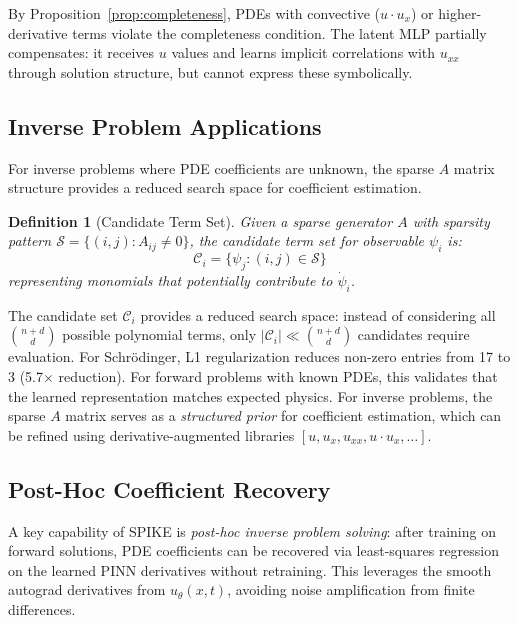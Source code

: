 \documentclass{article}
\newtheorem{definition}{Definition}
\theoremstyle{remark}
\begin{document}
By Proposition~\ref{prop:completeness}, PDEs with convective ($u \cdot u_x$) or higher-derivative terms violate the completeness condition. The latent MLP partially compensates: it receives $u$ values and learns implicit correlations with $u_{xx}$ through solution structure, but cannot express these symbolically.

\subsection{Inverse Problem Applications}

For inverse problems where PDE coefficients are unknown, the sparse $A$ matrix structure provides a reduced search space for coefficient estimation.

\begin{definition}[Candidate Term Set]
\label{def:candidate}
Given a sparse generator $A$ with sparsity pattern $\mathcal{S} = \{(i,j) : A_{ij} \neq 0\}$, the candidate term set for observable $\psi_i$ is:
\begin{equation}
\mathcal{C}_i = \{\psi_j : (i,j) \in \mathcal{S}\}
\end{equation}
representing monomials that potentially contribute to $\dot{\psi}_i$.
\end{definition}

The candidate set $\mathcal{C}_i$ provides a reduced search space: instead of considering all $\binom{n+d}{d}$ possible polynomial terms, only $|\mathcal{C}_i| \ll \binom{n+d}{d}$ candidates require evaluation. For Schr\"odinger, L1 regularization reduces non-zero entries from 17 to 3 (5.7$\times$ reduction). For forward problems with known PDEs, this validates that the learned representation matches expected physics. For inverse problems, the sparse $A$ matrix serves as a \textit{structured prior} for coefficient estimation, which can be refined using derivative-augmented libraries $[u, u_x, u_{xx}, u \cdot u_x, \ldots]$.

\subsection{Post-Hoc Coefficient Recovery}

A key capability of SPIKE is \textit{post-hoc inverse problem solving}: after training on forward solutions, PDE coefficients can be recovered via least-squares regression on the learned PINN derivatives without retraining. This leverages the smooth autograd derivatives from $u_\theta(x,t)$, avoiding noise amplification from finite differences.
\end{document}
